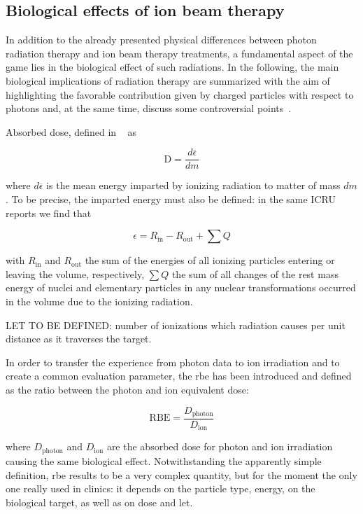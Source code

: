 \subsection{Biological effects of ion beam therapy}\label{chap1::subsec::bioEffects} 
In addition to the already presented physical differences between photon radiation therapy and ion beam therapy treatments, a fundamental aspect of the game lies in the biological effect of such radiations. In the following, the main biological implications of radiation therapy are summarized with the aim of highlighting the favorable contribution given by charged particles with respect to photons and, at the same time, discuss some controversial points~\parencite{Paganetti2013}.
  

Absorbed dose, defined in ~\cite{ICRU1980, ICRU1998} as 

\begin{equation}
\mathrm{D} = \frac{d\overline{\epsilon}}{dm}
\label{chap1::eq::AbsDoseDef}
\end{equation}

where $d\overline{\epsilon}$ is the mean energy imparted by ionizing radiation to matter of mass $dm$. To be precise, the imparted energy must also be defined: in the same ICRU reports we find that 


\begin{equation}
\epsilon = R_{\mathrm{in}} - R_{\mathrm{out}} + \sum{Q}
\label{chap1::eq::impEnergyDef}
\end{equation}

with $R_{\mathrm{in}}$ and $R_{\mathrm{out}}$ the sum of the energies of all ionizing particles entering or leaving the volume, respectively, $ \sum{Q}$ the sum of all changes of the rest mass energy of nuclei and elementary particles in any nuclear transformations occurred in the volume due to the ionizing radiation.

LET TO BE DEFINED: number of ionizations which radiation causes per unit distance as it traverses the target.

In order to transfer the experience from photon data to ion irradiation and to create a common evaluation parameter, the \gls{rbe} has been introduced and defined as the ratio between the photon and ion equivalent dose:

\begin{equation}
\mathrm{RBE} = \frac{D_{\mathrm{photon}}}{D_{\mathrm{ion}}}
\label{chap1::eq::rbeDef}
\end{equation}

where $D_{\mathrm{photon}}$ and $D_{\mathrm{ion}}$ are the absorbed dose for photon and ion irradiation causing the same biological effect. Notwithstanding the apparently simple definition, \gls{rbe} results to be a very complex quantity, but for the moment the only one really used in clinics: it depends on the particle type, energy, on the biological target, as well as on dose and \gls{let}.


